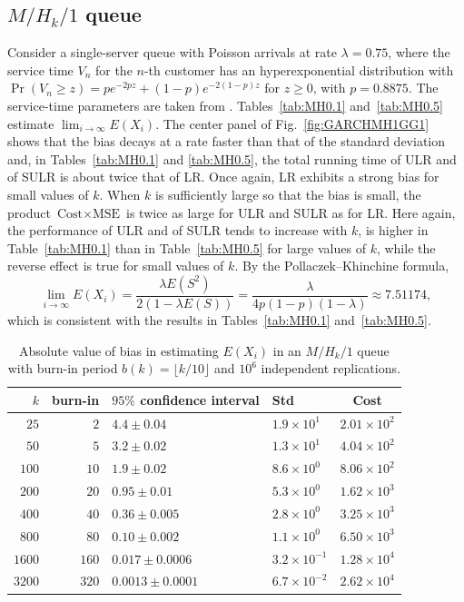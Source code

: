 \documentclass[a4paper,11pt]{article}
\begin{document}
\subsection{\(M/H_{k}/1\) queue}Consider a single-server queue with Poisson arrivals at rate \(\lambda=0.75\), where the service time \(V_{n}\) for the \(n\)-th customer      has an hyperexponential distribution with \(\Pr(V_{n}\geq z)=pe^{-2pz}+(1-p)e^{-2(1-p)z}\) for \(z\geq0\), with \(p=0.8875 \). The service-time parameters are taken from \cite{whitt1991longRun}. Tables~\ref{tab:MH0.1} and~\ref{tab:MH0.5} estimate \(\lim_{i\rightarrow\infty}E(X_{i})\). The center panel of
  Fig.~\ref{fig:GARCHMH1GG1} shows that the bias decays at a rate faster  than that of the standard deviation and, in Tables~\ref{tab:MH0.1} and \ref{tab:MH0.5}, the total running time of ULR and of SULR is about twice that of LR. Once again, LR exhibits a strong bias for small values of  \(k\).  When \(k\) is sufficiently large so that the bias is small,  the product \(\text{Cost}\times\text{MSE}\) is twice as large for ULR and SULR as for LR.  Here again, the performance of ULR and of  SULR tends to increase with \(k\),    is higher in  Table~\ref{tab:MH0.1} than in Table~\ref{tab:MH0.5} for large  values of \(k\), while the reverse effect is true for small values of \(k\). 
By the Pollaczek--Khinchine formula,
\begin{displaymath}
\lim_{i\rightarrow\infty}E(X_{i})=\frac{\lambda E(S^{2}) }{2(1-\lambda E(S))}=\frac{\lambda }{4p(1-p)(1-\lambda )}\approx7.51174,
\end{displaymath}
which is consistent with the results in Tables~\ref{tab:MH0.1} and~\ref{tab:MH0.5}. \begin{table}
\caption{Absolute value of bias in estimating \(E(X_{i})\) in an \(M/H_{k}/1\) queue with burn-in period  \(b(k)=\lfloor k/10\rfloor\) and \(10^{6}\) independent replications.}
\begin{center}
\begin{small}
\begin{tabular}{rrllc}\hline
$k$ &  burn-in   & $95\%$ confidence interval  & Std  & Cost  \\ \hline
 $25$&$2 $  & $4.4 \pm 0.04$ & $1.9\times10^1$ & $2.01\times10^2$ \\
$50$&$5 $  & $3.2 \pm 0.02$ & $1.3\times10^1$ & $4.04\times10^2$ \\
$100$&$10 $  & $1.9 \pm 0.02$ & $8.6\times10^0$ & $8.06\times10^2$ \\
$200$&$20 $  & $0.95 \pm 0.01$ & $5.3\times10^0$ & $1.62\times10^3$ \\
$400$&$40 $ & $0.36 \pm 0.005$ & $2.8\times10^0$ & $3.25\times10^3$ \\
$800$&$80 $ & $0.10 \pm 0.002$ & $1.1\times10^0$ & $6.50\times10^3$ \\
$1600$&$160 $ & $0.017 \pm 0.0006$ & $3.2\times10^{-1}$ & $1.28\times10^4$ \\
$3200$&$320 $ & $0.0013 \pm 0.0001$ & $6.7\times10^{-2}$ & $2.62\times10^4$ \\
\hline\end{tabular}
 \end{small}
 \end{center}
\label{tab:BiasMH0.1}
\end{table}
\end{document}
